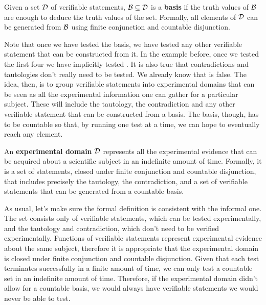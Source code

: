 \documentclass[11pt,letterpaper,fleqn]{memoir} %
\begin{document}
\begin{mathSection}
	\begin{defn}
		Given a set $\mathcal{D}$ of verifiable statements, $\mathcal{B} \subseteq \mathcal{D}$ is a \textbf{basis} if the truth values of $\mathcal{B}$ are enough to deduce the truth values of the set. Formally, all elements of $\mathcal{D}$ can be generated from $\mathcal{B}$ using finite conjunction and countable disjunction.
	\end{defn}
\end{mathSection}

Note that once we have tested the basis, we have tested any other verifiable statement that can be constructed from it. In the example before, once we tested the first four we have implicitly tested . It is also true that contradictions and tautologies don't really need to be tested. We already know that  is false. The idea, then, is to group verifiable statements into experimental domains that can be seen as all the experimental information one can gather for a particular subject. These will include the tautology, the contradiction and any other verifiable statement that can be constructed from a basis. The basis, though, has to be countable so that, by running one test at a time, we can hope to eventually reach any element.

\begin{mathSection}
\begin{defn}
	An \textbf{experimental domain} $\mathcal{D}$ represents all the experimental evidence that can be acquired about a scientific subject in an indefinite amount of time. Formally, it is a set of statements, closed under finite conjunction and countable disjunction, that includes precisely the tautology, the contradiction, and a set of verifiable statements that can be generated from a countable basis.
\end{defn}
\begin{justification}
	As usual, let's make sure the formal definition is consistent with the informal one. The set consists only of verifiable statements, which can be tested experimentally, and the tautology and contradiction, which don't need to be verified experimentally. Functions of verifiable statements represent experimental evidence about the same subject, therefore it is appropriate that the experimental domain is closed under finite conjunction and countable disjunction. Given that each test terminates successfully in a finite amount of time, we can only test a countable set in an indefinite amount of time. Therefore, if the experimental domain didn't allow for a countable basis, we would always have verifiable statements we would never be able to test.
\end{justification}
\end{mathSection}
\end{document}
